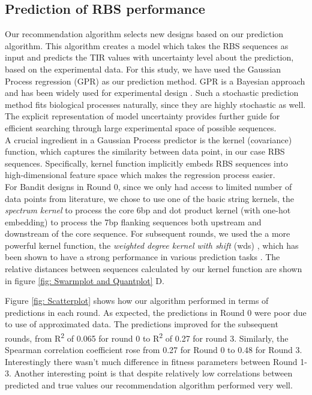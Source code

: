 \documentclass{article}
\begin{document}
\subsection{Prediction of RBS performance}

Our recommendation algorithm selects new designs based on our prediction algorithm.
This algorithm creates a model which takes the RBS sequences as input and predicts the TIR values with uncertainty level about the prediction, based on the experimental data.
For this study, we have used the Gaussian Process regression (GPR) as our prediction method.
GPR is a Bayesian approach and has been widely used for experimental design \cite{srinivas2012information, romero_navigating_2013}.
Such a stochastic prediction method fits biological processes naturally, since they are highly stochastic as well. 
The explicit representation of model uncertainty provides further guide for efficient searching through large experimental space of possible sequences.\\ 

A crucial ingredient in a Gaussian Process predictor \cite{Rasmussen2004} is the kernel (covariance) function, which captures the similarity between data point, in our case RBS sequences.
Specifically, kernel function implicitly embeds RBS sequences into high-dimensional feature space which makes the regression process easier.\\

For Bandit designs in Round 0, since we only had access to limited number of data points from literature, we chose to use one of the basic string kernels, the \textit{spectrum kernel} \cite{leslie2001spectrum} to process the core 6bp and dot product kernel \cite{Rasmussen2004} (with one-hot embedding) to process the 7bp flanking sequences both upstream and downstream of the core sequence.
For subsequent rounds, we used the a more powerful kernel function, the \textit{weighted degree kernel with shift} (wds) \cite{ratsch_rase_2005_wds}, which has been shown to have a strong performance in various prediction tasks \cite{Ben-Hur2008}.
The relative distances between sequences calculated by our kernel function are shown in figure \ref{fig: Swarmplot and Quantplot} D.

Figure \ref{fig: Scatterplot} shows how our algorithm performed in terms of predictions in each round. 
As expected, the predictions in Round 0 were poor due to use of approximated data. 
The predictions improved for the subsequent rounds, from R\textsuperscript{2} of 0.065 for round 0 to R\textsuperscript{2} of 0.27 for round 3.
Similarly, the Spearman correlation coefficient rose from 0.27 for Round 0 to 0.48 for Round 3.
Interestingly there wasn't much difference in fitness parameters between Round 1-3.
Another interesting point is that despite relatively low correlations between predicted and true values our recommendation algorithm performed very well.
\end{document}
